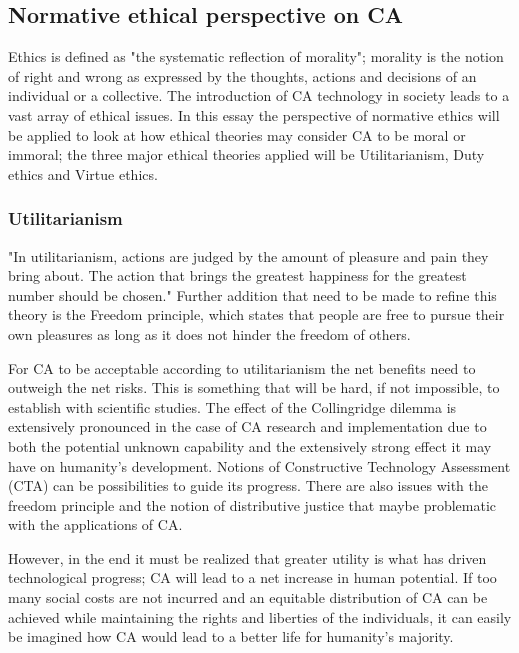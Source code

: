 \subsection{Normative ethical perspective on CA}

Ethics is defined as "the systematic reflection of morality"\cite[ch. 3.2]{Ethics_textbook}; morality is the notion of right and wrong as expressed by the thoughts, actions and decisions of an individual or a collective. The introduction of CA technology in society leads to a vast array of ethical issues. In this essay the perspective of normative ethics will be applied to look at how ethical theories may consider CA to be moral or immoral; the three major ethical theories applied will be Utilitarianism, Duty ethics and Virtue ethics.

\subsubsection{Utilitarianism}

"In utilitarianism, actions are judged by the amount of pleasure and pain they bring about. The action that brings the greatest happiness for the greatest number should be chosen." \cite[ch. 3.7]{Ethics_textbook} Further addition that need to be made to refine this theory is the Freedom principle, which states that people are free to pursue their own pleasures as long as it does not hinder the freedom of others. 

For CA to be acceptable according to utilitarianism the net benefits need to outweigh the net risks. This is something that will be hard, if not impossible, to establish with scientific studies. The effect of the Collingridge dilemma \cite{collingridge1980social} is extensively pronounced in the case of CA research and implementation due to both the potential unknown capability and the extensively strong effect it may have on humanity's development. Notions of Constructive Technology Assessment (CTA) \cite{schot1992constructive,schot1997past} can be possibilities to guide its progress. There are also issues with the freedom principle and the notion of distributive justice that maybe problematic with the applications of CA. 

However, in the end it must be realized that greater utility is what has driven technological progress; CA will lead to a net increase in human potential. If too many social costs are not incurred and an equitable distribution of CA can be achieved while maintaining the rights and liberties of the individuals, it can easily be imagined how CA would lead to a better life for humanity's majority.

